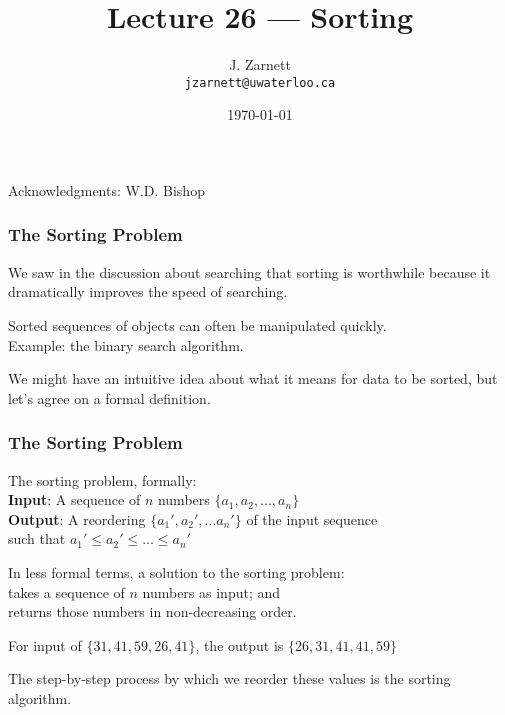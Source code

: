 

\title{Lecture 26 --- Sorting }

\author{J. Zarnett\\
\texttt{jzarnett@uwaterloo.ca}}
\date{\today}



\begin{frame}
  \titlepage
  
  \begin{center}
  \small{Acknowledgments: W.D. Bishop}
  \end{center}
\end{frame}

\begin{frame}
\frametitle{The Sorting Problem}
We saw in the discussion about searching that sorting is worthwhile because it dramatically improves the speed of searching.

Sorted sequences of objects can often be manipulated quickly.\\
\quad Example: the binary search algorithm.

We might have an intuitive idea about what it means for data to be sorted, but let's agree on a formal definition.

\end{frame}

\begin{frame}
\frametitle{The Sorting Problem}

The sorting problem, formally:\\
\quad \textbf{Input}: A sequence of $n$ numbers $\{a_{1}, a_{2}, ...,  a_{n}\}$\\
\quad \textbf{Output}: A reordering $\{a_{1}', a_{2}', ... a_{n}'\}$ of the input sequence \\
\quad \quad \quad such that $a_{1}' \leq a_{2}' \leq ... \leq a_{n}'$

In less formal terms, a solution to the sorting problem:\\
\quad takes a sequence of $n$ numbers as input; and \\
\quad returns those numbers in non-decreasing order.

For input of $\{31, 41, 59, 26, 41\}$, the output is $\{26, 31, 41, 41, 59 \}$

The step-by-step process by which we reorder these values is the \alert{sorting algorithm}.



\end{frame}

